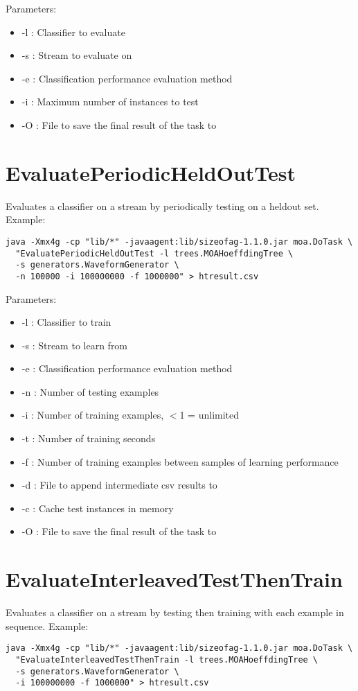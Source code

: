 \documentclass[a4paper,12pt,twoside]{book}
\begin{document}
Parameters:
\begin{itemize}
\item -l : Classifier to evaluate
\item -s : Stream to evaluate on
\item -e : Classification performance evaluation method
\item -i : Maximum number of instances to test
\item -O : File to save the final result of the task to
\end{itemize}

\section{EvaluatePeriodicHeldOutTest}

Evaluates a classifier on a stream by periodically testing on a heldout set.
Example:
\begin{footnotesize}\begin{verbatim}
java -Xmx4g -cp "lib/*" -javaagent:lib/sizeofag-1.1.0.jar moa.DoTask \
  "EvaluatePeriodicHeldOutTest -l trees.MOAHoeffdingTree \
  -s generators.WaveformGenerator \
  -n 100000 -i 100000000 -f 1000000" > htresult.csv
\end{verbatim}\end{footnotesize}

Parameters:
\begin{itemize}
\item -l : Classifier to train
\item -s : Stream to learn from
\item -e : Classification performance evaluation method
\item -n : Number of testing examples
\item -i : Number of training examples, $<$1 = unlimited
\item -t : Number of training seconds
\item -f : Number of training examples between samples of learning performance
\item -d : File to append intermediate csv results to
\item -c : Cache test instances in memory
\item -O : File to save the final result of the task to
\end{itemize}

\section{EvaluateInterleavedTestThenTrain}
Evaluates a classifier on a stream by testing then training with each example in sequence.
Example:
\begin{footnotesize}\begin{verbatim}
java -Xmx4g -cp "lib/*" -javaagent:lib/sizeofag-1.1.0.jar moa.DoTask \
  "EvaluateInterleavedTestThenTrain -l trees.MOAHoeffdingTree \
  -s generators.WaveformGenerator \
  -i 100000000 -f 1000000" > htresult.csv
\end{verbatim}
\end{footnotesize}
\end{document}
